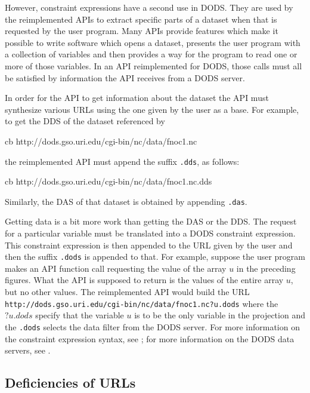 However, constraint expressions have a second use in DODS\@. They are used by
the reimplemented APIs to extract specific parts of a dataset when that is
requested by the user program. Many APIs provide features which make it
possible to write software which opens a dataset, presents the user program
with a collection of variables and then provides a way for the program to
read one or more of those variables. In an API reimplemented for DODS, those
calls must all be satisfied by information the API receives from a DODS
server.

In order for the API to get information about the dataset the API
must synthesize various URLs using the one given by the user as a
base. For example, to get the DDS of the dataset referenced by 

\begin{code}{cb}
    http://dods.gso.uri.edu/cgi-bin/nc/data/fnoc1.nc
\end{code}

\noindent the reimplemented API must append the suffix {\tt .dds}, as
follows:

\begin{code}{cb}
    http://dods.gso.uri.edu/cgi-bin/nc/data/fnoc1.nc.dds
\end{code}

\noindent Similarly, the DAS of that dataset is obtained by appending
{\tt .das}.

Getting data is a bit more work than getting the DAS or the DDS\@. The
request for a particular variable must be translated into a DODS
constraint expression. This constraint expression is then appended to
the URL given by the user and then the suffix {\tt .dods} is appended
to that. For example, suppose the user program makes an API function
call requesting the value of the array $u$ in the preceding
figures. What the API is supposed to return is the values of the
entire array $u$, but no other values. The reimplemented API would
build the URL {\tt
http://dods.gso.uri.edu/cgi-bin/nc/data/fnoc1.nc?u.dods} where the
$?u.dods$ specify that the variable $u$ is to be the only variable in
the projection and the {\tt .dods} selects the data filter from the
DODS server. For more information on the constraint expression syntax,
see \DAP; for more information on the DODS data servers, see \DDD\@.

\subsection{Deficiencies of URLs}
\label{url:deficiencies}

